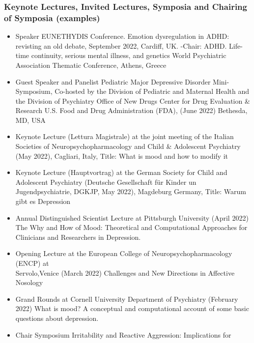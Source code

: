 \documentclass[
]{article}
\providecommand{\tightlist}{%
  \setlength{\itemsep}{0pt}\setlength{\parskip}{0pt}}
\begin{document}
\hypertarget{keynote-lectures-invited-lectures-symposia-and-chairing-of-symposia-examples}{%
\subsubsection{Keynote Lectures, Invited Lectures, Symposia and Chairing
of Symposia
(examples)}\label{keynote-lectures-invited-lectures-symposia-and-chairing-of-symposia-examples}}

\begin{itemize}
\tightlist
\item
  Speaker EUNETHYDIS Conference. Emotion dysregulation in ADHD:
  revisting an old debate, September 2022, Cardiff, UK. -Chair: ADHD.
  Life-time continuity, serious mental illness, and genetics World
  Psychiatric Association Thematic Conference, Athens, Greece
\item
  Guest Speaker and Panelist Pediatric Major Depressive Disorder
  Mini-Symposium, Co-hosted by the Division of Pediatric and Maternal
  Health and the Division of Psychiatry Office of New Drugs \textbar{}
  Center for Drug Evaluation \& Research \textbar{} U.S. Food and Drug
  Administration (FDA), (June 2022) Bethesda, MD, USA
\item
  Keynote Lecture (Lettura Magistrale) at the joint meeting of the
  Italian Societies of Neuropsychopharmacology and Child \& Adolescent
  Psychiatry (May 2022), Cagliari, Italy, Title: What is mood and how to
  modify it
\item
  Keynote Lecture (Hauptvortrag) at the German Society for Child and
  Adolescent Psychiatry (Deutsche Gesellschaft für Kinder un
  Jugendpsychiatrie, DGKJP, May 2022), Magdeburg Germany, Title: Warum
  gibt es Depression
\item
  Annual Distinguished Scientist Lecture at Pittsburgh University (April
  2022) The Why and How of Mood: Theoretical and Computational
  Approaches for Clinicians and Researchers in Depression.
\item
  Opening Lecture at the European College of Neuropsychopharmacology
  (ENCP) at\\
  Servolo,Venice (March 2022) Challenges and New Directions in Affective
  Nosology
\item
  Grand Rounds at Cornell University Department of Psychiatry (February
  2022) What is mood? A conceptual and computational account of some
  basic questions about depression.
\item
  Chair Symposium Irritability and Reactive Aggression: Implications for

\end{itemize}
\end{document}
